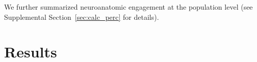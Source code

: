 \documentclass[10pt]{article}\usepackage[]{graphicx}\usepackage[]{color}
\begin{document}

We further summarized neuroanatomic engagement at the population level (see Supplemental Section~\ref{sec:calc_perc} for details).  




\section{Results}


\end{document}
